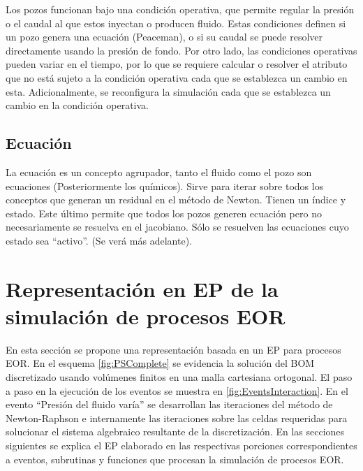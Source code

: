 Los pozos funcionan bajo una condición operativa, que permite regular la presión o el caudal al que estos inyectan o producen fluido. Estas condiciones definen si un pozo genera una ecuación (Peaceman), o si su caudal se puede resolver directamente usando la presión de fondo. Por otro lado, las condiciones operativas pueden variar en el tiempo, por lo que se requiere calcular o resolver el atributo que no está sujeto a la condición operativa cada que se establezca un cambio en esta. Adicionalmente, se reconfigura la simulación cada que se establezca un cambio en la condición operativa.

\subsection{Ecuación}\label{sec:PS_Equation}
La ecuación es un concepto agrupador, tanto el fluido como el pozo son ecuaciones (Posteriormente los químicos). Sirve para iterar sobre todos los conceptos que generan un residual en el método de Newton. Tienen un índice y estado. Este último permite que todos los pozos generen ecuación pero no necesariamente se resuelva en el jacobiano. Sólo se resuelven las ecuaciones cuyo estado sea ``activo''. (Se verá más adelante).


\section{Representación en EP de la simulación de procesos EOR}\label{sec:PS_EOR}
En esta sección se propone una representación basada en un EP para procesos EOR. En el esquema \ref{fig:PSComplete} se evidencia la solución del BOM discretizado usando volúmenes finitos en una malla cartesiana ortogonal. El paso a paso en la ejecución de los eventos se muestra en \ref{fig:EventsInteraction}.  En el evento ``Presión del fluido varía'' se desarrollan las iteraciones del método de Newton-Raphson e internamente las iteraciones sobre las celdas requeridas para solucionar el sistema algebraico resultante de la discretización. En las secciones siguientes se explica el EP elaborado en las respectivas porciones correspondientes a eventos, subrutinas y funciones que procesan la simulación de procesos EOR. \\

